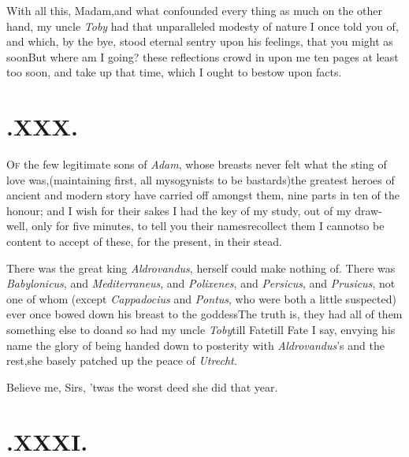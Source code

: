\documentclass{article}
\begin{document}
\enlargethispage\baselineskip
With all this, Madam,\tsk and what confounded every thing as
much on the other hand, my uncle \textit{Toby} had that unparalleled
modesty of nature I once told you of, and which, by the bye, stood
eternal sentry upon his feelings, that you might as soon\tsh But where am I going?
these reflections crowd in upon me ten pages at least too soon, and
take up that time, which I ought to bestow upon facts.

\etp{}\eject
\null\smallskip

\section{.\enspace XXX.}

\lettrine{O}{f} the few legitimate sons of
\textit{Adam}, whose breasts never felt what the sting of love
was,\tsk (maintaining first, all mysogynists to be
bastards)\tsk the greatest heroes of ancient and modern story
have carried off amongst them, nine parts in ten of the honour; and
I wish for their sakes I had the key of my study, out of my
draw-well, only for five minutes, to tell you their
names\tsk recollect them I cannot\tsk so be content to accept
of these, for the present, in their stead.\tsh

There was the great king \textit{Aldrovandus},\break
{}
\break
herself could make nothing of.\tsh{}
There
was \textit{Babylonicus}, and \textit{Mediterraneus}, and
\textit{Polixenes}, and \textit{Persicus}, and \textit{Prusicus}, not one
of whom (except \textit{Cappadocius} and \textit{Pontus}, who were both
a little suspected) ever once bowed down his breast to the
goddess\tsh The truth is, they had all of them something
else to do\tsk and so had my uncle \textit{Toby}\tsk till
Fate\tsk till Fate I say, envying his name the glory of being
handed down to posterity with \textit{Aldrovandus}’s and the
rest,\tsk she basely patched up the peace of \textit{Utrecht.}

\tsh Believe me, Sirs, ’twas the worst deed she
did that year.

\setlength{\baselineskip}{12.7826pt}
\section{.\enspace XXXI.}
\end{document}
